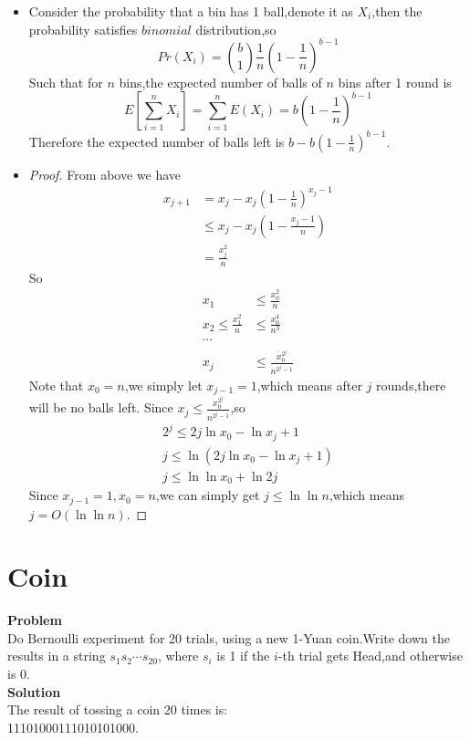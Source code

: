 	\begin{itemize}
		\item
		Consider the probability that a bin has 1 ball,denote it as $X_i$,then the probability satisfies $binomial$ distribution,so
		\begin{equation*}
		Pr(X_i)=\binom{b}{1} \frac{1}{n} \left(1-\frac{1}{n} \right)^{b-1}
		\end{equation*}
		Such that for $n$ bins,the expected number of balls of $n$ bins after 1 round is
		\begin{equation*}
		E\left[\sum_{i=1}^{n} X_i\right]= \sum_{i=1}^{n} E(X_i)= b \left(1-\frac{1}{n}\right)^{b-1}
		\end{equation*}
		Therefore the expected number of balls left is $b-b \left(1-\frac{1}{n}\right)^{b-1}$.
		\item
		\begin{proof}
			From above we have
		\begin{equation*}
		\begin{split}
		x_{j+1} 
		&= x_j-x_j \left(1-\frac{1}{n}\right)^{x_j-1}\\
		&\leq x_j-x_j \left(1-\frac{x_j-1}{n}\right)\\
		&= \frac{x_j^2}{n}
		\end{split}
		\end{equation*}
		So
		\begin{equation*}
		\begin{split}
		x_1 &\leq \frac{x_0^2}{n}\\
		x_2 \leq \frac{x_1^2}{n} &\leq \frac{x_0^4}{n^3}\\
		\cdots\\
		x_j &\leq \frac{x_0^{2^j}}{n^{2^j-1}}
		\end{split}
		\end{equation*}
		Note that $x_0=n$,we simply let $x_{j-1}=1$,which means after $j$ rounds,there will be no balls left.
		Since $x_j \leq \frac{x_0^{2^j}}{n^{2^j-1}}$,so
		\begin{equation*}
		\begin{split}
		2^j \leq 2j\ln x_0-\ln x_j +1\\
		j \leq \ln \left(2j\ln x_0 - \ln x_j +1\right)\\
		j \leq \ln \ln x_0+\ln2j
		\end{split}
		\end{equation*}
		Since $x_{j-1}=1,x_0=n$,we can simply get $j \leq \ln \ln n$,which means $j=O(\ln \ln n)$.
		\end{proof}
	\end{itemize}

	\section{Coin}
	\textbf{Problem}\\
	Do Bernoulli experiment for 20 trials, using a new 1-Yuan coin.Write down the results in a string $s_1 s_2 \cdots s_{20}$, where $s_i$ is 1 if the $i$-th trial gets Head,and otherwise is 0.
	\\
	\textbf{Solution}\\
	The result of tossing a coin 20 times is:\\11101000111010101000.
	

